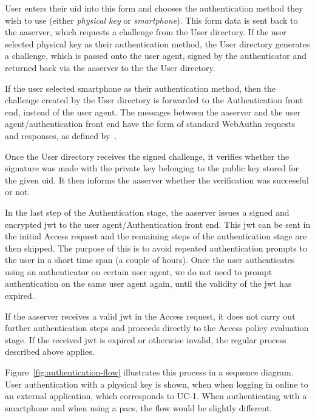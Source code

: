 User enters their \acrshort{uid} into this form and chooses the authentication method they wish to use (either \textit{physical key} or \textit{smartphone}). This form data is sent back to the \acrshort{aaserver}, which requests a challenge from the User directory. If the user selected physical key as their authentication method, the User directory generates a challenge, which is passed onto the user agent, signed by the authenticator and returned back via the \acrshort{aaserver} to the the User directory.

If the user selected smartphone as their authentication method, then the challenge created by the User directory is forwarded to the Authentication front end, instead of the user agent. The messages between the \acrshort{aaserver} and the user agent/authentication front end have the form of standard WebAuthn requests and responses, as defined by~\cite{Balfanz2019Web1}. 

Once the User directory receives the signed challenge, it verifies whether the signature was made with the private key belonging to the public key stored for the given \acrshort{uid}. It then informs the \acrshort{aaserver} whether the verification was successful or not.

In the last step of the Authentication stage, the \acrshort{aaserver} issues a signed and encrypted \acrshort{jwt} to the user agent/Authentication front end. This \acrshort{jwt} can be sent in the initial Access request and the remaining steps of the authentication stage are then skipped. The purpose of this is to avoid repeated authentication prompts to the user in a short time span (a couple of hours). Once the user authenticates using an authenticator on certain user agent, we do not need to prompt authentication on the same user agent again, until the validity of the \acrshort{jwt} has expired.

If the \acrshort{aaserver} receives a valid \acrshort{jwt} in the Access request, it does not carry out further authentication steps and proceeds directly to the Access policy evaluation stage. If the received \acrshort{jwt} is expired or otherwise invalid, the regular process described above applies.

Figure~\ref{fig:authentication-flow} illustrates this process in a sequence diagram. User authentication with a physical key is shown, when when logging in online to an external application, which corresponds to UC-1. When authenticating with a smartphone and when using a \acrshort{pacs}, the flow would be slightly different.

